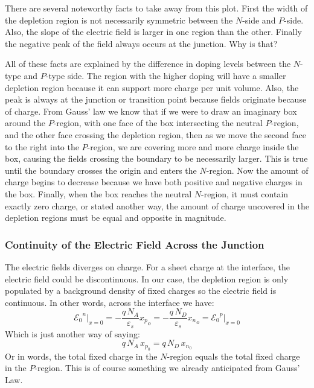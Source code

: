 There are several noteworthy facts to take away from this plot.  First the width of the depletion region is not necessarily symmetric between the $N$-side and $P$-side.  Also, the slope of the electric field is larger in one region than the other.  Finally the negative peak of the field always occurs at the junction.  Why is that?

All of these facts are explained by the difference in doping levels between the $N$-type and $P$-type side.  The region with the higher doping will have a smaller depletion region because it can support more charge per unit volume.  Also, the peak is always at the junction or transition point because fields originate because of charge.  From Gauss' law we know that if we were to draw an imaginary box around the $P$-region, with one face of the box intersecting the neutral $P$-region, and the other face crossing the depletion region, then as we move the second face to the right into the $P$-region, we are covering more and more charge inside the box, causing the fields crossing the boundary to be necessarily larger.  This is true until the boundary crosses the origin and enters the $N$-region.  Now the amount of charge begins to decrease because we have both positive and negative charges in the box.  Finally, when the box reaches the neutral $N$-region, it must contain exactly zero charge, or stated another way, the amount of charge uncovered in the depletion regions must be equal and opposite in magnitude.
\subsubsection{Continuity of the Electric Field Across the Junction}
The electric fields diverges on charge. For a sheet charge at the interface, the electric field could be discontinuous.   In our case, the depletion region is only populated by a background density of fixed charges so the electric field is continuous.  In other words, across the interface we have:
    \begin{equation} 
        {{\mathcal{E}_0}^n}\big\rvert_{x = 0} = -\frac{q\,N_A}{\varepsilon_s}{x_p}_o =  
        -\frac{q\,N_D}{\varepsilon_s}{x_n}_o = {{\mathcal{E}_0}^p}\big\rvert_{x = 0} 
    \end{equation}
Which is just another way of saying:
    \begin{equation} 
        q\,N_A\,x_{p_0} = q\,N_D\,x_{n_0} 
    \end{equation}
Or in words, the total fixed charge in the $N$-region equals the total fixed charge in the $P$-region.  This is of course something we already anticipated from Gauss' Law.
